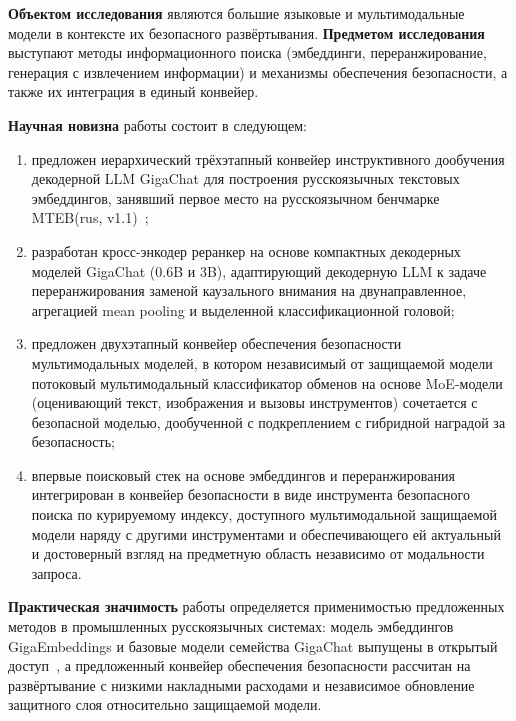 \textbf{Объектом исследования} являются большие языковые и мультимодальные модели в контексте их безопасного развёртывания. \textbf{Предметом исследования} выступают методы информационного поиска (эмбеддинги, переранжирование, генерация с извлечением информации) и механизмы обеспечения безопасности, а также их интеграция в единый конвейер.

\textbf{Научная новизна} работы состоит в следующем:
\begin{enumerate}
    \item предложен иерархический трёхэтапный конвейер инструктивного дообучения декодерной LLM GigaChat для построения русскоязычных текстовых эмбеддингов, занявший первое место на русскоязычном бенчмарке MTEB(rus, v1.1)~\cite{2510.22369};
    \item разработан кросс-энкодер реранкер на основе компактных декодерных моделей GigaChat (0.6B и 3B), адаптирующий декодерную LLM к задаче переранжирования заменой каузального внимания на двунаправленное, агрегацией mean pooling и выделенной классификационной головой;
    \item предложен двухэтапный конвейер обеспечения безопасности мультимодальных моделей, в котором независимый от защищаемой модели потоковый мультимодальный классификатор обменов на основе MoE-модели (оценивающий текст, изображения и вызовы инструментов) сочетается с безопасной моделью, дообученной с подкреплением с гибридной наградой за безопасность;
    \item впервые поисковый стек на основе эмбеддингов и переранжирования интегрирован в конвейер безопасности в виде инструмента безопасного поиска по курируемому индексу, доступного мультимодальной защищаемой модели наряду с другими инструментами и обеспечивающего ей актуальный и достоверный взгляд на предметную область независимо от модальности запроса.
\end{enumerate}

\textbf{Практическая значимость} работы определяется применимостью предложенных методов в промышленных русскоязычных системах: модель эмбеддингов GigaEmbeddings и базовые модели семейства GigaChat выпущены в открытый доступ~\cite{2506.09440,2510.22369,gigaembeddings_hf,gigachat3_10b}, а предложенный конвейер обеспечения безопасности рассчитан на развёртывание с низкими накладными расходами и независимое обновление защитного слоя относительно защищаемой модели.

